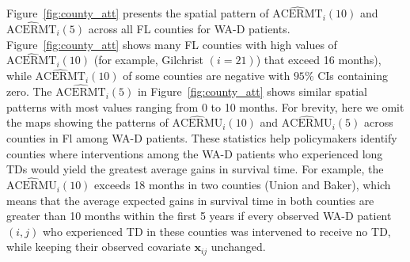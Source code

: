 \documentclass[aoas]{imsart}
\theoremstyle{plain}
\theoremstyle{definition}
\begin{document}
\noindent Figure~\ref{fig:county_att} presents the spatial pattern of $\widehat{\text{ACERMT}}_i(10)$ and $\widehat{\text{ACERMT}}_i(5)$ across all FL counties for WA-D patients.
Figure~\ref{fig:county_att} shows many FL counties with high values of $\widehat{\text{ACERMT}}_i(10)$ (for example, Gilchrist $(i=21)$) that exceed 16 months), while $\widehat{\text{ACERMT}}_i(10)$ of some counties are negative with $95\%$ CIs containing zero. The $\widehat{\text{ACERMT}}_i(5)$ in Figure~\ref{fig:county_att} shows similar spatial patterns with most values ranging from 0 to 10 months. 
For brevity, here we omit the maps showing the patterns of $\widehat{\text{ACERMU}}_i(10)$ and $\widehat{\text{ACERMU}}_i(5)$ across counties in Fl among WA-D patients. These statistics help policymakers identify counties where interventions among the WA-D patients who experienced long TDs would yield the greatest average gains in survival time. 
For example, the $\widehat{\text{ACERMU}}_i(10)$ exceeds 18 months in two counties (Union and Baker), which means that the average expected gains in survival time in both counties are greater than 10 months within the first 5 years if every observed WA-D patient $(i,j)$ who experienced TD in these counties was intervened to receive no TD, while keeping their observed covariate $\mathbf{x}_{ij}$ unchanged.
\end{document}
